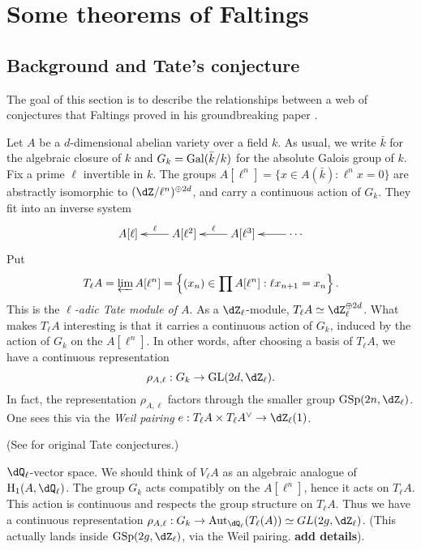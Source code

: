




\section{Some theorems of Faltings}





\subsection{Background and Tate's conjecture}

The goal of this section is to describe the relationships between a web of 
conjectures that Faltings proved in his groundbreaking paper 
\cite{fa86}. 

Let $A$ be a $d$-dimensional abelian variety over a field $k$. As usual, we 
write $\bar k$ for the algebraic closure of $k$ and $G_k=\operatorname{Gal}(\bar k/k)$ for 
the absolute Galois group of $k$. Fix a prime $\ell$ invertible in $k$. The 
groups $A[\ell^n] = \{x\in A(\bar k):\ell^n x=0\}$ are abstractly isomorphic 
to $(\dZ/\ell^n)^{\oplus 2d}$, and carry a continuous action of $G_k$. They 
fit into an inverse system 
\[\xymatrix{
  A[\ell] 
    & A[\ell^2] \ar[l]_-\ell 
    & A[\ell^3] \ar[l]_-\ell 
    & \cdots \ar[l]
}\]
Put 
\[
  T_\ell A = \varprojlim A[\ell^n] = \left\{(x_n)\in \prod A[\ell^n] : \ell x_{n+1} = x_n\right\} \text{.}
\]
This is the \emph{$\ell$-adic Tate module of $A$}. As a $\dZ_\ell$-module, 
$T_\ell A \simeq \dZ_\ell^{\oplus 2 d}$. What makes $T_\ell A$ interesting is 
that it carries a continuous action of $G_k$, induced by the action of $G_k$ 
on the $A[\ell^n]$. In other words, after choosing a basis of $T_\ell A$, we 
have a continuous representation 
\[
  \rho_{A,\ell} : G_k \to \operatorname{GL}(2 d,\dZ_\ell) \text{.}
\]
In fact, the representation $\rho_{A,\ell}$ factors through the smaller group 
$\operatorname{GSp}(2 n,\dZ_\ell)$. One sees this via the \emph{Weil pairing} 
$e:T_\ell A \times T_\ell A^\vee \to \dZ_\ell(1)$. 

(See \cite{ta65} for original Tate conjectures.) 

$\dQ_\ell$-vector space. We should think of $V_\ell A$ as an algebraic 
analogue of $\h_1(A,\dQ_\ell)$. The group $G_k$ acts compatibly on the 
$A[\ell^n]$, hence it acts on $T_\ell A$. This action is continuous and 
respects the group structure on $T_\ell A$. Thus we have a continuous 
representation 
$\rho_{A,\ell} : G_k \to \aut_{\dQ_\ell}(T_\ell(A))\simeq GL(2 g,\dZ_\ell)$. 
(This actually lands inside $\operatorname{GSp}(2 g,\dZ_\ell)$, via the Weil 
pairing. \textbf{add details}). 

